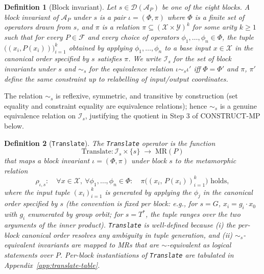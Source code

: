 \documentclass[acmsmall, screen]{acmart}
\newtheorem{definition}{Definition}
\begin{document}
\begin{definition}[Block invariant]
\label{def:block-invariant}
Let $s \in \mathcal{D}(\mathcal{A}_P)$ be one of the eight blocks. A \emph{block invariant of $\mathcal{A}_P$ under $s$} is a pair $\iota = (\Phi, \pi)$ where $\Phi$ is a finite set of operators drawn from $s$, and $\pi$ is a relation $\pi \subseteq (\mathcal{X} \times \mathcal{Y})^k$ for some arity $k \ge 1$ such that for every $P \in \mathcal{F}$ and every choice of operators $\phi_1, \dots, \phi_n \in \Phi$, the tuple $\bigl((x_i, P(x_i))\bigr)_{i=1}^k$ obtained by applying $\phi_1, \dots, \phi_n$ to a base input $x \in \mathcal{X}$ in the canonical order specified by $s$ satisfies $\pi$. We write $\mathcal{I}_s$ for the set of block invariants under $s$ and $\sim_s$ for the equivalence relation $\iota \sim_s \iota'$ iff $\Phi = \Phi'$ and $\pi$, $\pi'$ define the same constraint up to relabelling of input/output coordinates.
\end{definition}

The relation $\sim_s$ is reflexive, symmetric, and transitive by construction (set equality and constraint equality are equivalence relations); hence $\sim_s$ is a genuine equivalence relation on $\mathcal{I}_s$, justifying the quotient in Step 3 of CONSTRUCT-MP below.

\begin{definition}[\texttt{Translate}]
\label{def:translate}
The \texttt{Translate} operator is the function
\[
\mathrm{Translate}: \mathcal{I}_s \times \{s\} \;\longrightarrow\; \mathrm{MR}(P)
\]
that maps a block invariant $\iota = (\Phi, \pi)$ under block $s$ to the metamorphic relation
\[
\rho_{\iota,s}: \quad \forall x \in \mathcal{X},\ \forall \phi_1, \dots, \phi_n \in \Phi : \quad \pi\bigl((x_i,\, P(x_i))_{i=1}^k\bigr) \text{ holds},
\]
where the input tuple $(x_i)_{i=1}^k$ is generated by applying the $\phi_j$ in the canonical order specified by $s$ (the convention is fixed per block: e.g., for $s = G$, $x_i = g_i \cdot x_0$ with $g_i$ enumerated by group orbit; for $s = T^{*}$, the tuple ranges over the two arguments of the inner product). \texttt{Translate} is well-defined because (i) the per-block canonical order resolves any ambiguity in tuple generation, and (ii) $\sim_s$-equivalent invariants are mapped to MRs that are $\sim$-equivalent as logical statements over $P$. Per-block instantiations of \texttt{Translate} are tabulated in Appendix~\ref{app:translate-table}.
\end{definition}
\end{document}
